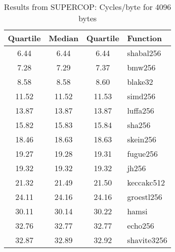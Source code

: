 \begin{table}
  \centering
  \begin{tabular}{ | c | c | c | l | }
    \hline
    \textbf{Quartile} & \textbf{Median} & \textbf{Quartile} & \textbf{Function} \\ \hline
    6.44 & 6.44 & 6.44 & shabal256 \\ \hline
    7.28 & 7.29 & 7.37 & bmw256 \\ \hline
    8.58 & 8.58 & 8.60 & blake32 \\ \hline
    11.52 & 11.52 & 11.53 & simd256 \\ \hline
    13.87 & 13.87 & 13.87 & luffa256 \\ \hline
    15.82 & 15.83 & 15.84 & sha256 \\ \hline
    18.46 & 18.63 & 18.63 & skein256 \\ \hline
    19.27 & 19.28 & 19.31 & fugue256 \\ \hline
    19.32 & 19.32 & 19.32 & jh256 \\ \hline
    21.32 & 21.49 & 21.50 & keccakc512 \\ \hline
    24.11 & 24.16 & 24.16 & groestl256 \\ \hline
    30.11 & 30.14 & 30.22 & hamsi \\ \hline
    32.76 & 32.77 & 32.77 & echo256 \\ \hline
    32.87 & 32.89 & 32.92 & shavite3256 \\ \hline
  \end{tabular}
  \caption{Results from SUPERCOP: Cycles/byte for 4096 bytes}
  \label{tbl:supercop:4096}
\end{table}

